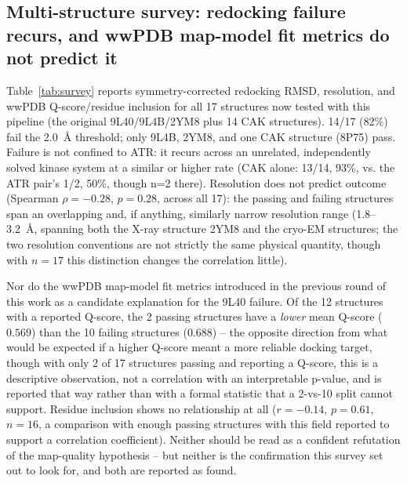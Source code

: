 \documentclass[11pt]{article}
\begin{document}
\subsection*{Multi-structure survey: redocking failure recurs, and wwPDB
map-model fit metrics do not predict it}

Table~\ref{tab:survey} reports symmetry-corrected redocking RMSD,
resolution, and wwPDB Q-score/residue inclusion for all 17 structures now
tested with this pipeline (the original 9L40/9L4B/2YM8 plus 14 CAK
structures). 14/17 (82\%) fail the 2.0~{\AA} threshold; only 9L4B, 2YM8,
and one CAK structure (8P75) pass. Failure is not confined to ATR: it
recurs across an unrelated, independently solved kinase system at a
similar or higher rate (CAK alone: 13/14, 93\%, vs. the ATR pair's 1/2,
50\%, though n=2 there). Resolution does not predict outcome (Spearman
$\rho=-0.28$, $p=0.28$, across all 17): the passing and failing
structures span an overlapping and, if anything, similarly narrow
resolution range (1.8--3.2~{\AA}, spanning both the X-ray structure 2YM8
and the cryo-EM structures; the two resolution conventions are not
strictly the same physical quantity, though with $n=17$ this distinction
changes the correlation little).

Nor do the wwPDB map-model fit metrics introduced in the previous round of
this work as a candidate explanation for the 9L40 failure. Of the 12
structures with a reported Q-score, the 2 passing structures have a
\emph{lower} mean Q-score ($0.569$) than the 10 failing structures
($0.688$) -- the opposite direction from what would be expected if a
higher Q-score meant a more reliable docking target, though with only 2
of 17 structures passing and reporting a Q-score, this is a descriptive
observation, not a correlation with an interpretable p-value, and is
reported that way rather than with a formal statistic that a 2-vs-10
split cannot support. Residue inclusion shows no relationship at all
($r=-0.14$, $p=0.61$, $n=16$, a comparison with enough passing structures
with this field reported to support a correlation coefficient). Neither
should be read as a confident refutation of the map-quality hypothesis --
but neither is the confirmation this survey set out to look for, and both
are reported as found.
\end{document}
